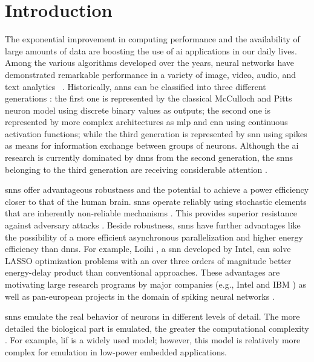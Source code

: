 \section{Introduction}
\label{sec:introduction}
The exponential improvement in computing performance and the availability of large amounts of data are boosting the use of \gls{ai} applications in our daily lives. Among the various algorithms developed over the years, neural networks have demonstrated remarkable performance in a variety of image, video, audio, and text analytics ~\cite{schmidhuber2015deep,Taigman_2014_CVPR}. Historically, \glspl{ann} can be classified into three different generations \cite{Design_Exploration_SbS_Trans20}: the first one is represented by the classical McCulloch and Pitts neuron model using discrete binary values as outputs; the second one is represented by more complex architectures as \gls{mlp} and \gls{cnn} using continuous activation functions; while the third generation is represented by \gls{snn} using spikes as means for information exchange between groups of neurons. Although the \gls{ai} research is currently dominated by \glspl{dnn} from the second generation, the \glspl{snn} belonging to the third generation are receiving considerable attention \cite{Spinnaker_Trans13,ernst2007efficient,Design_Exploration_SbS_Trans20, SNN_Survey_Trans19}.

\glspl{snn} offer advantageous robustness and the potential to achieve a power efficiency closer to that of the human brain.
\glspl{snn} operate reliably using stochastic elements that are inherently non-reliable mechanisms \cite{mcdonnell2011benefits}.
This provides superior resistance against adversary attacks
\cite{ernst2007efficient, Dapello2020.06.16.154542}. Beside
robustness, \glspl{snn} have further advantages like the possibility of a more efficient asynchronous parallelization and higher
energy efficiency than \glspl{dnn}. For
example, Loihi \cite{davies2018loihi}, a \gls{snn} developed by Intel, can
solve LASSO optimization problems with an over three orders of
magnitude better energy-delay product than conventional
approaches. These advantages are motivating large research programs by
major companies (e.g., Intel \cite{davies2018loihi} and IBM
\cite{TrueNorth_Trans15}) as well as pan-european projects in the
domain of spiking neural networks \cite{Spinnaker_Trans13}.


\glspl{snn} emulate the real behavior of neurons in different levels of detail. The more detailed the biological part is emulated, the greater the computational complexity \cite{izhikevich2004model,amunts2019human}. For example, \gls{lif} is a widely used model; however, this model is relatively more complex for emulation in low-power embedded applications.
	

